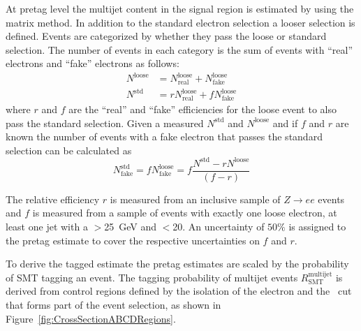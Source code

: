 At pretag level the multijet content in the signal region is estimated by using the matrix method. In addition to the standard electron selection a looser selection is defined. Events are categorized by whether they pass the loose or standard selection. The number of events in each category is the sum of events with ``real'' electrons and ``fake'' electrons as follows:
%
\begin{align*}
  N^{\textrm{loose}} &= N_{\textrm{real}}^{\textrm{loose}} + N_{\textrm{fake}}^{\textrm{loose}} \\
  N^{\textrm{std}} &= rN_{\textrm{real}}^{\textrm{loose}} + fN_{\textrm{fake}}^{\textrm{loose}}
\end{align*}
%
where $r$ and $f$ are the ``real'' and ``fake'' efficiencies for the loose event to also pass the standard selection. Given a measured $N^{\textrm{std}}$ and $N^{\textrm{loose}}$ and if $f$ and $r$ are known the number of events with a fake electron that passes the standard selection can be calculated as
%
\begin{equation*}
  N_{\textrm{fake}}^{\textrm{std}} = fN_{\textrm{fake}}^{\textrm{loose}} = f\frac{N^{\textrm{std}}-r N^{\textrm{loose}} }{(f-r)}
\end{equation*}

The relative efficiency $r$ is measured from an inclusive sample of $Z\rightarrow ee$ events and $f$ is measured from a sample of events with exactly one loose electron, at least one jet with a \pt$>$\SI{25}{\GeV} and \met$<${20}{\GeV}. An uncertainty of $50\%$ is assigned to the pretag estimate to cover the respective uncertainties on $f$ and $r$.

To derive the tagged estimate the pretag estimates are scaled by the probability of SMT tagging an event. The tagging probability of multijet events $R_{\textrm{SMT}}^{\textrm{multijet}}$ is derived from control regions defined by the isolation of the electron and the \met\ cut that forms part of the event selection, as shown in Figure~\ref{fig:CrossSectionABCDRegions}.

